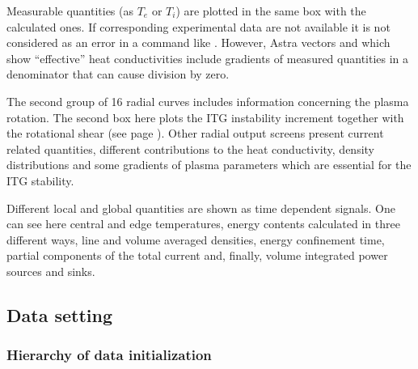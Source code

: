 Measurable quantities (as $T_e$ or $T_i$) are plotted in the same box
with the calculated ones.
If corresponding experimental data are not available it is not 
considered as an error in a command like .
However, Astra vectors  and  which show 
``effective'' heat conductivities include gradients of measured
quantities in a denominator that can cause division by zero.

The second group of 16 radial curves includes information concerning
the plasma rotation.
The second box here plots the ITG instability increment 
together with the rotational shear  
(see page \pageref{ROTSH}).
Other radial output screens present current related quantities,
different contributions to the heat conductivity, density 
distributions and some gradients of plasma parameters which are
essential for the ITG stability.

Different local and global quantities are shown as time dependent
signals.
One can see here central and edge temperatures, energy contents
calculated in three different ways, line and volume averaged
densities, energy confinement time, partial 
components of the total current and, finally, volume integrated
power sources and sinks.

\subsection{Data setting}

\subsubsection{Hierarchy of data initialization}

